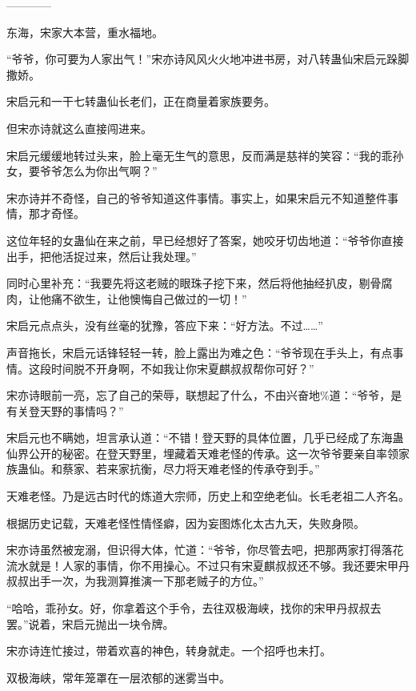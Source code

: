 
\begin{this_body}

------------

东海，宋家大本营，重水福地。

“爷爷，你可要为人家出气！”宋亦诗风风火火地冲进书房，对八转蛊仙宋启元跺脚撒娇。

宋启元和一干七转蛊仙长老们，正在商量着家族要务。

但宋亦诗就这么直接闯进来。

宋启元缓缓地转过头来，脸上毫无生气的意思，反而满是慈祥的笑容：“我的乖孙女，要爷爷怎么为你出气啊？”

宋亦诗并不奇怪，自己的爷爷知道这件事情。事实上，如果宋启元不知道整件事情，那才奇怪。

这位年轻的女蛊仙在来之前，早已经想好了答案，她咬牙切齿地道：“爷爷你直接出手，把他活捉过来，然后让我处理。”

同时心里补充：“我要先将这老贼的眼珠子挖下来，然后将他抽经扒皮，剔骨腐肉，让他痛不欲生，让他懊悔自己做过的一切！”

宋启元点点头，没有丝毫的犹豫，答应下来：“好方法。不过……”

声音拖长，宋启元话锋轻轻一转，脸上露出为难之色：“爷爷现在手头上，有点事情。这段时间脱不开身啊，不如我让你宋夏麒叔叔帮你可好？”

宋亦诗眼前一亮，忘了自己的荣辱，联想起了什么，不由兴奋地\%道：“爷爷，是有关登天野的事情吗？”

宋启元也不瞒她，坦言承认道：“不错！登天野的具体位置，几乎已经成了东海蛊仙界公开的秘密。在登天野里，埋藏着天难老怪的传承。这一次爷爷要亲自率领家族蛊仙。和蔡家、若来家抗衡，尽力将天难老怪的传承夺到手。”

天难老怪。乃是远古时代的炼道大宗师，历史上和空绝老仙。长毛老祖二人齐名。

根据历史记载，天难老怪性情怪癖，因为妄图炼化太古九天，失败身陨。

宋亦诗虽然被宠溺，但识得大体，忙道：“爷爷，你尽管去吧，把那两家打得落花流水就是！人家的事情，你不用操心。不过只有宋夏麒叔叔还不够。我还要宋甲丹叔叔出手一次，为我测算推演一下那老贼子的方位。”

“哈哈，乖孙女。好，你拿着这个手令，去往双极海峡，找你的宋甲丹叔叔去罢。”说着，宋启元抛出一块令牌。

宋亦诗连忙接过，带着欢喜的神色，转身就走。一个招呼也未打。

双极海峡，常年笼罩在一层浓郁的迷雾当中。


\end{this_body}
